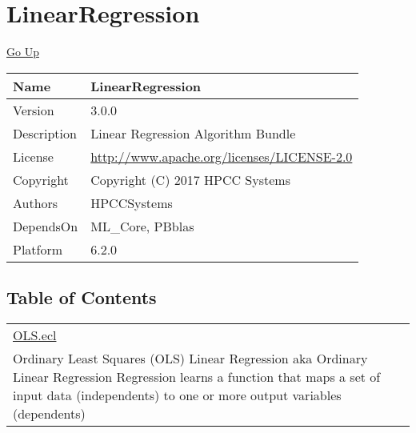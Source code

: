 \chapter*{\color{headtoc} LinearRegression}
\hypertarget{ecldoc:toc:root/LinearRegression}{}
\hyperlink{ecldoc:toc:root}{Go Up}

\begin{tabularx}{\textwidth}{|l|X|}
\hline
Name &
LinearRegression
 \\
\hline
Version &
3.0.0
 \\
\hline
Description &
Linear Regression Algorithm Bundle
 \\
\hline
License &
\url{http://www.apache.org/licenses/LICENSE-2.0}
 \\
\hline
Copyright &
Copyright (C) 2017 HPCC Systems
 \\
\hline
Authors &
HPCCSystems
 \\
\hline
DependsOn &
ML\_Core, PBblas
 \\
\hline
Platform &
6.2.0
 \\
\hline
\end{tabularx}

\section*{Table of Contents}
{\renewcommand{\arraystretch}{1.5}
\begin{longtable}{|p{\textwidth}|}
\hline
\hyperlink{ecldoc:toc:LinearRegression.OLS}{OLS.ecl} \\
Ordinary Least Squares (OLS) Linear Regression aka Ordinary Linear Regression Regression learns a function that maps a set of input data (independents) to one or more output variables (dependents) \\
\hline
\end{longtable}
}


